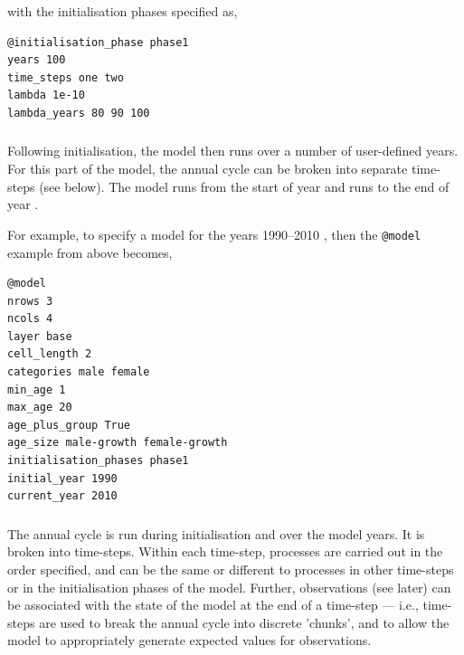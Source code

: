 with the initialisation phases specified as,
{\small{\begin{verbatim}
@initialisation_phase phase1
years 100
time_steps one two
lambda 1e-10
lambda_years 80 90 100
\end{verbatim}}}

\subsubsection{}

Following initialisation, the model then runs over a number of user-defined years. For this part of the model, the annual cycle can be broken into separate time-steps (see below). The model runs from the start of year  and runs to the end of year . %

For example, to specify a model for the years 1990--2010 , then the \texttt{@model} example from above becomes,
{\small{\begin{verbatim}
@model
nrows 3
ncols 4
layer base
cell_length 2
categories male female
min_age 1
max_age 20
age_plus_group True
age_size male-growth female-growth
initialisation_phases phase1
initial_year 1990
current_year 2010
\end{verbatim}}}

%

\subsubsection{}

The annual cycle is run during initialisation and over the model years. It is broken into time-steps. Within each time-step, processes are carried out in the order specified, and can be the same or different to processes in other time-steps or in the initialisation phases of the model. Further, observations (see later) can be associated with the state of the model at the end of a time-step --- i.e., time-steps are used to break the annual cycle into discrete 'chunks', and to allow the model to appropriately generate expected values for observations. 

